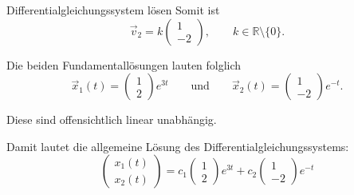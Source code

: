 \begin{bsp}{Differentialgleichungssystem lösen}{}
    Somit ist
    \[
        \vec{v}_2=k
        \begin{pmatrix}
            1 \\-2
        \end{pmatrix},
        \qquad k\in\mathbb{R}\setminus\{0\}.
    \]

    Die beiden Fundamentallösungen lauten folglich
    \[
        \vec{x}_1(t)=
        \begin{pmatrix}
            1 \\2
        \end{pmatrix}e^{3t}
        \qquad\text{und}\qquad
        \vec{x}_2(t)=
        \begin{pmatrix}
            1 \\-2
        \end{pmatrix}e^{-t}.
    \]

    Diese sind offensichtlich linear unabhängig.

    Damit lautet die allgemeine Lösung des
    Differentialgleichungssystems:
    \[
        \boxed{
            \begin{pmatrix}
                x_1(t) \\
                x_2(t)
            \end{pmatrix}
            =
            c_1
            \begin{pmatrix}
                1 \\2
            \end{pmatrix}e^{3t}
            +
            c_2
            \begin{pmatrix}
                1 \\-2
            \end{pmatrix}e^{-t}
        }
    \]

\end{bsp}

